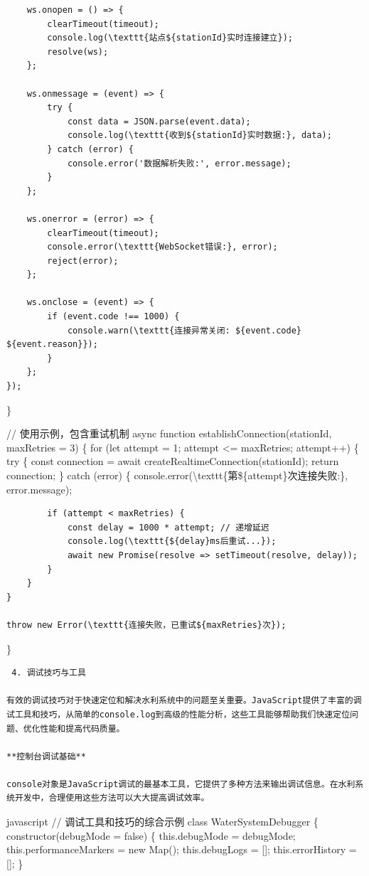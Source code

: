 {{\begin{verbatim}
    ws.onopen = () => {
        clearTimeout(timeout);
        console.log(\texttt{站点${stationId}实时连接建立});
        resolve(ws);
    };
    
    ws.onmessage = (event) => {
        try {
            const data = JSON.parse(event.data);
            console.log(\texttt{收到${stationId}实时数据:}, data);
        } catch (error) {
            console.error('数据解析失败:', error.message);
        }
    };
    
    ws.onerror = (error) => {
        clearTimeout(timeout);
        console.error(\texttt{WebSocket错误:}, error);
        reject(error);
    };
    
    ws.onclose = (event) => {
        if (event.code !== 1000) {
            console.warn(\texttt{连接异常关闭: ${event.code} ${event.reason}});
        }
    };
});
\end{verbatim}

\}

// 使用示例，包含重试机制 async function establishConnection(stationId, maxRetries = 3) \{ for (let attempt = 1; attempt \textless= maxRetries; attempt++) \{ try \{ const connection = await createRealtimeConnection(stationId); return connection; \} catch (error) \{ console.error(\textbackslash texttt\{第\$\{attempt\}次连接失败:\}, error.message);

\begin{verbatim}
        if (attempt < maxRetries) {
            const delay = 1000 * attempt; // 递增延迟
            console.log(\texttt{${delay}ms后重试...});
            await new Promise(resolve => setTimeout(resolve, delay));
        }
    }
}

throw new Error(\texttt{连接失败，已重试${maxRetries}次});
\end{verbatim}

\}

\begin{lstlisting}
 4. 调试技巧与工具

有效的调试技巧对于快速定位和解决水利系统中的问题至关重要。JavaScript提供了丰富的调试工具和技巧，从简单的console.log到高级的性能分析，这些工具能够帮助我们快速定位问题、优化性能和提高代码质量。

**控制台调试基础**

console对象是JavaScript调试的最基本工具，它提供了多种方法来输出调试信息。在水利系统开发中，合理使用这些方法可以大大提高调试效率。
\end{lstlisting}

javascript // 调试工具和技巧的综合示例 class WaterSystemDebugger \{ constructor(debugMode = false) \{ this.debugMode = debugMode; this.performanceMarkers = new Map(); this.debugLogs = {[}{]}; this.errorHistory = {[}{]}; \}

}}

